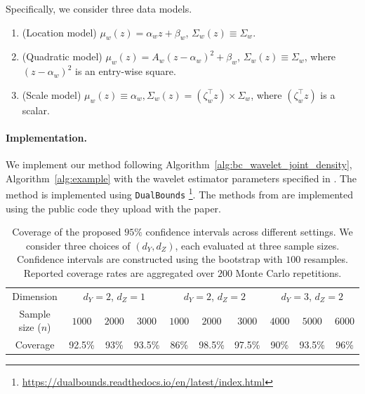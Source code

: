 \documentclass{article}
\theoremstyle{plain}
\theoremstyle{definition}
\theoremstyle{plain}
\begin{document}
Specifically, we consider three data models.
\begin{enumerate}
    \item (Location model) $\mu_w(z) = \alpha_w z + \beta_w$, $\Sigma_w(z) \equiv \Sigma_w$.
    \item (Quadratic model) $\mu_w(z) = A_w (z - \alpha_w)^2 + \beta_w$, $\Sigma_w(z) \equiv \Sigma_w$, where $(z - \alpha_w)^2$ is an entry-wise square.
    \item (Scale model) $\mu_w(z) \equiv \alpha_w, \Sigma_w(z) = (\zeta_w^\top z) \times \Sigma_w$, where $(\zeta_w^\top z)$ is a scalar.
\end{enumerate}



\paragraph{Implementation.}We implement our method following Algorithm~\ref{alg:bc_wavelet_joint_density}, Algorithm~\ref{alg:example} with
the wavelet estimator parameters specified in . The method \parencite{ji2023model} is implemented using \texttt{DualBounds} \footnote{\url{https://dualbounds.readthedocs.io/en/latest/index.html}}. The methods from \parencite{lin2025tightening, lin2025estimation} are implemented using the public code they upload with the paper.

\begin{table}[tbp]
\centering
\caption{
Coverage of the proposed $95\%$ confidence intervals across different settings. 
We consider three choices of $(d_Y, d_Z)$, each evaluated at three sample sizes. 
Confidence intervals are constructed using the bootstrap with $100$ resamples. 
Reported coverage rates are aggregated over $200$ Monte Carlo repetitions.
}\label{tab:coverage}
\begin{tabular}{c|ccc|ccc|ccc}
\toprule
{Dimension} 
& \multicolumn{3}{c|}{$d_Y=2$, $d_Z=1$} 
& \multicolumn{3}{c|}{$d_Y=2$, $d_Z=2$} 
& \multicolumn{3}{c}{$d_Y=3$, $d_Z=2$} \\
{Sample size ($n$)} 
& $1000$ & $2000$ & $3000$
& $1000$ & $2000$ & $3000$
& $4000$ & $5000$ & $6000$\\
\midrule
Coverage
& 92.5\% & 93\%  &  93.5\%
& 86\% & 98.5\% & 97.5\%
& 90\% & 93.5\%  & 96\%  \\
\bottomrule
\end{tabular}
\end{table}
\end{document}
